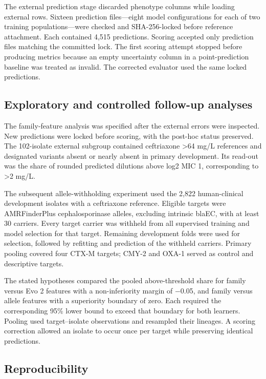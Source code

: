 \documentclass[
  american,
  11pt,
]{article}
\begin{document}
The external prediction stage discarded phenotype columns while loading
external rows. Sixteen prediction files---eight model configurations for
each of two training populations---were checked and SHA-256-locked
before reference attachment. Each contained 4,515 predictions. Scoring
accepted only prediction files matching the committed lock. The first
scoring attempt stopped before producing metrics because an empty
uncertainty column in a point-prediction baseline was treated as
invalid. The corrected evaluator used the same locked predictions.

\subsection{Exploratory and controlled follow-up
analyses}\label{exploratory-and-controlled-follow-up-analyses}

The family-feature analysis was specified after the external errors were
inspected. New predictions were locked before scoring, with the post-hoc
status preserved. The 102-isolate external subgroup contained
ceftriaxone \textgreater64 mg/L references and designated variants
absent or nearly absent in primary development. Its read-out was the
share of rounded predicted dilutions above log2 MIC 1, corresponding to
\textgreater2 mg/L.

The subsequent allele-withholding experiment used the 2,822
human-clinical development isolates with a ceftriaxone reference.
Eligible targets were AMRFinderPlus cephalosporinase alleles, excluding
intrinsic blaEC, with at least 30 carriers. Every target carrier was
withheld from all supervised training and model selection for that
target. Remaining development folds were used for selection, followed by
refitting and prediction of the withheld carriers. Primary pooling
covered four CTX-M targets; CMY-2 and OXA-1 served as control and
descriptive targets.

The stated hypotheses compared the pooled above-threshold share for
family versus Evo 2 features with a non-inferiority margin of \ensuremath{-}0.05, and
family versus allele features with a superiority boundary of zero. Each
required the corresponding 95\% lower bound to exceed that boundary for
both learners. Pooling used target--isolate observations and resampled
their lineages. A scoring correction allowed an isolate to occur once
per target while preserving identical predictions.

\subsection{Reproducibility}\label{reproducibility}
\end{document}
